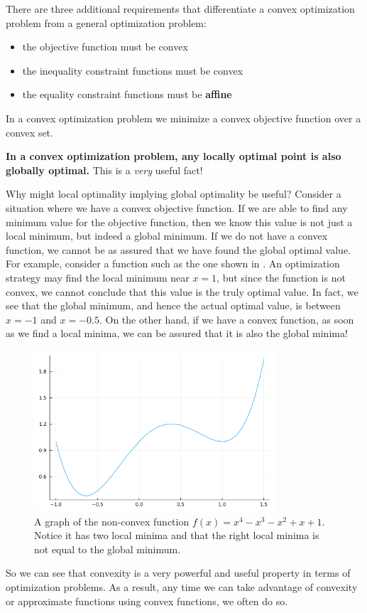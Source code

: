 There are three additional requirements that differentiate a convex optimization problem from a general optimization problem:
{\color{baystate}
	\begin{itemize}
		\item the objective function must be convex
		\item the inequality constraint functions must be convex
		\item the equality constraint functions must be {\color{tiananmen}\textbf{affine}}
	\end{itemize}
}

In a convex optimization problem we minimize a convex objective function over a convex set.

\textbf{In a convex optimization problem, any {\color{tiananmen}\textbf{locally optimal point}} is also {\color{tiananmen}\textbf{globally optimal}}.} This is a \textit{very} useful fact!

Why might local optimality implying global optimality be useful? Consider a situation where we have a convex objective function. If we are able to find any minimum value for the objective function, then we know this value is not just a local minimum, but indeed a global minimum. If we do not have a convex function, we cannot be as assured that we have found the global optimal value. For example, consider a function such as the one shown in . An optimization strategy may find the local minimum near $x=1$, but since the function is not convex, we cannot conclude that this value is the truly optimal value. In fact, we see that the global minimum, and hence the actual optimal value, is between $x=-1$ and $x=-0.5$. On the other hand, if we have a convex function, as soon as we find a local minima, we can be assured that it is also the global minima!

\begin{figure}
	\centering
	\includegraphics[width=0.8\textwidth]{Chapter_I_Background/Images/Non-Convex-Example.png}
	\caption[A Non-Convex Function]{A graph of the non-convex function $f(x)=x^4-x^3-x^2+x+1$. Notice it has two local minima and that the right local minima is not equal to the global minimum.}
	\label{fig:non-convex-function-example}
\end{figure}

So we can see that convexity is a very powerful and useful property in terms of optimization problems. As a result, any time we can take advantage of convexity or approximate functions using convex functions, we often do so.